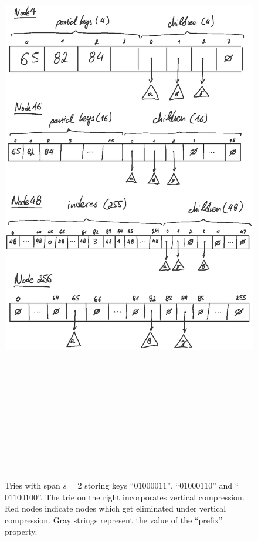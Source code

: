 \documentclass[abstracton,12pt]{scrartcl}
\theoremstyle{definition}
\begin{document}
\begin{figure}
  \vspace{-4cm}
  \hspace{-2cm}
  \includegraphics[height=27cm]{art_nodes_draw}
  \vspace{-3cm}
  \caption{
    Tries with span $s=2$ storing keys ``$01000011$'', ``$01000110$''
    and ``$01100100$''. The trie on the right incorporates vertical 
    compression. Red nodes indicate nodes which get eliminated under
    vertical compression. Gray strings represent the value of the ``prefix'' 
    property.
  }
  \label{fig:horizontal-compression}
\end{figure}

\newpage



\end{document}
